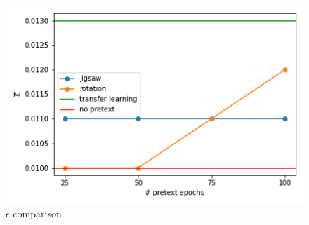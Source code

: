 \begin{figure}
    \includegraphics{images/epsilon}
    \caption{\label{fig:figure-3}$\overline{\epsilon}$ comparison}
\end{figure}



